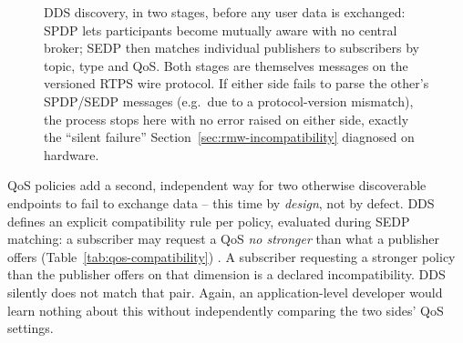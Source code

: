\begin{figure}[htbp]
  \centering
  \caption[DDS discovery: SPDP and SEDP stages]{DDS discovery, in two stages, before any user data is exchanged: SPDP lets participants become mutually aware with no central broker; SEDP then matches individual publishers to subscribers by topic, type and QoS. Both stages are themselves messages on the versioned RTPS wire protocol. If either side fails to parse the other's SPDP/SEDP messages (e.g.\ due to a protocol-version mismatch), the process stops here with no error raised on either side, exactly the ``silent failure'' Section~\ref{sec:rmw-incompatibility} diagnosed on hardware.}
  \label{fig:dds-discovery}
\end{figure}

QoS policies add a second, independent way for two otherwise
discoverable endpoints to fail to exchange data -- this time by
\emph{design}, not by defect. DDS defines an explicit compatibility
rule per policy, evaluated during SEDP matching: a subscriber may
request a QoS \emph{no stronger} than what a publisher offers
(Table~\ref{tab:qos-compatibility}) \cite{omg2015dds}. A subscriber
requesting a stronger policy than the publisher offers on that
dimension is a declared incompatibility. DDS silently does not
match that pair. Again, an application-level developer would learn
nothing about this without independently comparing the two sides'
QoS settings.

